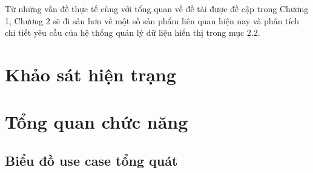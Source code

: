 \documentclass[../DoAn.tex]{subfiles}
\begin{document}
Từ những vấn đề thực tế cùng với tổng quan về đề tài được đề cập trong Chương 1, Chương 2 sẽ đi sâu hơn về một số sản phẩm liên quan hiện nay và phân tích chi tiết yêu cầu của hệ thống quản lý dữ liệu hiển thị trong mục 2.2.



\section{Khảo sát hiện trạng}
\label{section:2.1}

\section{Tổng quan chức năng}
\label{section:2.2}

\subsection{Biểu đồ use case tổng quát}
\label{subsection:2.2.1}
\end{document}
